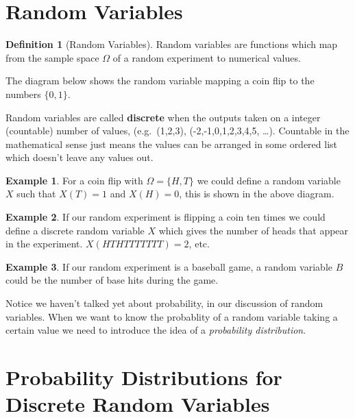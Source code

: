 \documentclass[
]{book}
\theoremstyle{definition}
\newtheorem{definition}{Definition}[chapter]
\theoremstyle{definition}
\newtheorem{example}{Example}[chapter]
\theoremstyle{definition}
\theoremstyle{definition}
\theoremstyle{remark}
\begin{document}
\hypertarget{random-variables}{%
\section{Random Variables}\label{random-variables}}

\begin{definition}[Random Variables]
\protect\hypertarget{def:unnamed-chunk-250}{}\label{def:unnamed-chunk-250}Random variables are functions which map from the sample space \(\Omega\) of a random experiment to numerical values.
\end{definition}

The diagram below shows the random variable mapping a coin flip to the numbers \(\{0,1\}\).

Random variables are called \textbf{discrete} when the outputs taken on a integer (countable) number of values, (e.g.~(1,2,3), (-2,-1,0,1,2,3,4,5, \ldots). Countable in the mathematical sense just means the values can be arranged in some ordered list which doesn't leave any values out.

\begin{example}
\protect\hypertarget{exm:unnamed-chunk-251}{}\label{exm:unnamed-chunk-251}For a coin flip with \(\Omega=\{H,T\}\) we could define a random variable \(X\) such that \(X(T)=1\) and \(X(H)=0\), this is shown in the above diagram.
\end{example}

\begin{example}
\protect\hypertarget{exm:unnamed-chunk-252}{}\label{exm:unnamed-chunk-252}If our random experiment is flipping a coin ten times we could define a discrete random variable \(X\) which gives the number of heads that appear in the experiment. \(X(HTHTTTTTTT)=2\), etc.
\end{example}

\begin{example}
\protect\hypertarget{exm:unnamed-chunk-253}{}\label{exm:unnamed-chunk-253}If our random experiment is a baseball game, a random variable \(B\) could be the number of base hits during the game.
\end{example}

Notice we haven't talked yet about probability, in our discussion of random variables. When we want to know the probablity of a random variable taking a certain value we need to introduce the idea of a \emph{probability distribution}.

\hypertarget{probability-distributions-for-discrete-random-variables}{%
\section{Probability Distributions for Discrete Random Variables}\label{probability-distributions-for-discrete-random-variables}}
\end{document}
